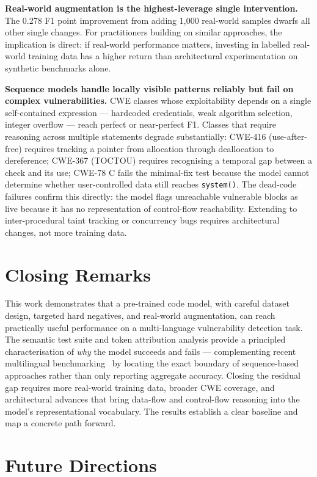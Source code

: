 \textbf{Real-world augmentation is the highest-leverage single intervention.}
The 0.278 F1 point improvement from adding 1{,}000 real-world samples dwarfs all other
single changes.
For practitioners building on similar approaches, the implication is direct: if real-world
performance matters, investing in labelled real-world training data has a higher return
than architectural experimentation on synthetic benchmarks alone.

\textbf{Sequence models handle locally visible patterns reliably but fail on complex vulnerabilities.}
CWE classes whose exploitability depends on a single self-contained expression ---
hardcoded credentials, weak algorithm selection, integer overflow --- reach perfect or
near-perfect F1.
Classes that require reasoning across multiple statements degrade substantially: CWE-416
(use-after-free) requires tracking a pointer from allocation through deallocation to
dereference; CWE-367 (TOCTOU) requires recognising a temporal gap between a check and
its use; CWE-78 C fails the minimal-fix test because the model cannot determine whether
user-controlled data still reaches \texttt{system()}.
The dead-code failures confirm this directly: the model flags unreachable vulnerable
blocks as live because it has no representation of control-flow reachability.
Extending to inter-procedural taint tracking or concurrency bugs requires architectural
changes, not more training data.

\section{Closing Remarks}

This work demonstrates that a pre-trained code model, with careful dataset design,
targeted hard negatives, and real-world augmentation, can reach practically useful
performance on a multi-language vulnerability detection task.
The semantic test suite and token attribution analysis provide a principled
characterisation of \emph{why} the model succeeds and fails --- complementing recent
multilingual benchmarking~\cite{shu2026multilingual,nguyen2025mulvuln} by locating the
exact boundary of sequence-based approaches rather than only reporting aggregate accuracy.
Closing the residual gap requires more real-world training data, broader CWE coverage,
and architectural advances that bring data-flow and control-flow reasoning into the
model's representational vocabulary.
The results establish a clear baseline and map a concrete path forward.

\section{Future Directions}

